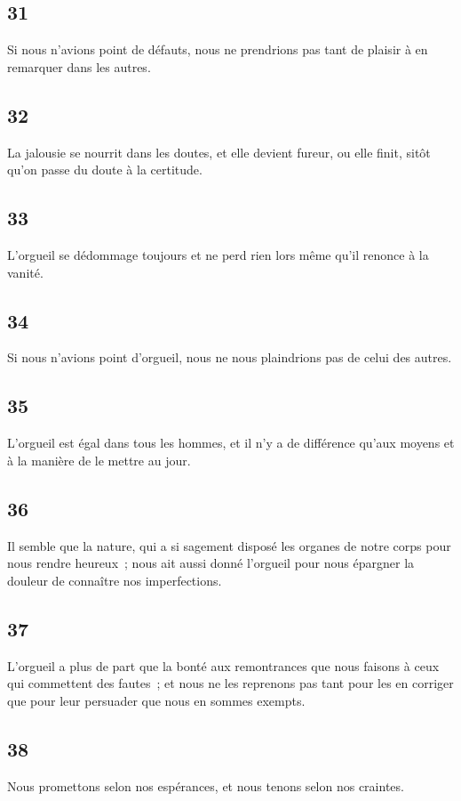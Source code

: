 \documentclass[french,twoside]{book} %
\begin{document}
\subsection[{31}]{ \textsc{31} }
\noindent Si nous n’avions point de défauts, nous ne prendrions pas tant de plaisir à en remarquer dans les autres.
\subsection[{32}]{ \textsc{32} }
\noindent La jalousie se nourrit dans les doutes, et elle devient fureur, ou elle finit, sitôt qu’on passe du doute à la certitude.
\subsection[{33}]{ \textsc{33} }
\noindent L’orgueil se dédommage toujours et ne perd rien lors même qu’il renonce à la vanité.
\subsection[{34}]{ \textsc{34} }
\noindent Si nous n’avions point d’orgueil, nous ne nous plaindrions pas de celui des autres.
\subsection[{35}]{ \textsc{35} }
\noindent L’orgueil est égal dans tous les hommes, et il n’y a de différence qu’aux moyens et à la manière de le mettre au jour.
\subsection[{36}]{ \textsc{36} }
\noindent Il semble que la nature, qui a si sagement disposé les organes de notre corps pour nous rendre heureux ; nous ait aussi donné l’orgueil pour nous épargner la douleur de connaître nos imperfections.
\subsection[{37}]{ \textsc{37} }
\noindent L’orgueil a plus de part que la bonté aux remontrances que nous faisons à ceux qui commettent des fautes ; et nous ne les reprenons pas tant pour les en corriger que pour leur persuader que nous en sommes exempts.
\subsection[{38}]{ \textsc{38} }
\noindent Nous promettons selon nos espérances, et nous tenons selon nos craintes.
\end{document}
